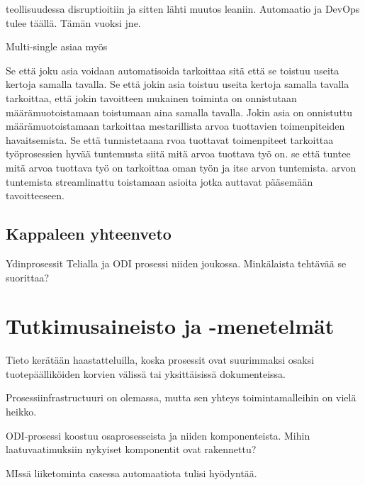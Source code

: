 \documentclass[finnish,12pt,a4paper,pdftex]{article}
\begin{document}
teollisuudessa disruptioitiin ja sitten lähti muutos leaniin.
Automaatio ja DevOps tulee täällä. Tämän vuoksi jne.

Multi-single asiaa myös


Se että joku asia voidaan automatisoida tarkoittaa sitä että se toistuu useita kertoja samalla tavalla. Se että jokin asia toistuu useita kertoja samalla tavalla tarkoittaa, että jokin tavoitteen mukainen toiminta on onnistutaan määrämuotoistamaan toistumaan aina samalla tavalla. Jokin asia on onnistuttu määrämuotoistamaan tarkoittaa mestarillista arvoa tuottavien toimenpiteiden havaitsemista. Se
 että tunnistetaana rvoa tuottavat toimenpiteet tarkoittaa työprosessien hyvää tuntemusta siitä mitä arvoa tuottava työ on. se että tuntee mitä arvoa tuottava työ on tarkoittaa oman työn ja itse arvon tuntemista.
arvon tuntemista
streamlinattu toistamaan asioita jotka auttavat pääsemään tavoitteeseen. 


\subsection{Kappaleen yhteenveto}


Ydinprosessit Telialla ja ODI prosessi niiden joukossa. Minkälaista tehtävää se suorittaa?










\clearpage

\section{Tutkimusaineisto ja -menetelmät}

Tieto kerätään haastatteluilla, koska prosessit ovat suurimmaksi osaksi tuotepäälliköiden korvien välissä tai yksittäisissä dokumenteissa.

Prosessiinfrastructuuri on olemassa, mutta sen yhteys toimintamalleihin on vielä heikko. 


ODI-prosessi koostuu osaprosesseista ja niiden komponenteista. Mihin laatuvaatimuksiin nykyiset komponentit ovat rakennettu?



MIssä liiketominta casessa automaatiota tulisi hyödyntää. 
\end{document}
